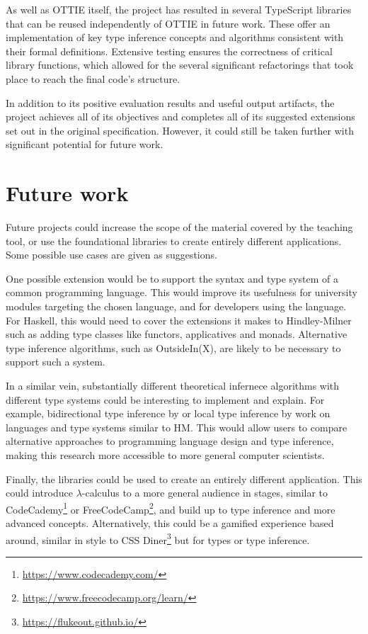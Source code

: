 \documentclass[a4paper,fleqn,oneside,12pt]{report}
\begin{document}
As well as OTTIE itself, the project has resulted in several TypeScript libraries that can be reused independently of OTTIE in future work. These offer an implementation of key type inference concepts and algorithms consistent with their formal definitions. Extensive testing ensures the correctness of critical library functions, which allowed for the several significant refactorings that took place to reach the final code's structure.

In addition to its positive evaluation results and useful output artifacts, the project achieves all of its objectives and completes all of its suggested extensions set out in the original specification. However, it could still be taken further with significant potential for future work.

\section{Future work}

Future projects could increase the scope of the material covered by the teaching tool, or use the foundational libraries to create entirely different applications. Some possible use cases are given as suggestions.

One possible extension would be to support the syntax and type system of a common programming language. This would improve its usefulness for university modules targeting the chosen language, and for developers using the language. For Haskell, this would need to cover the extensions it makes to Hindley-Milner such as adding type classes like functors, applicatives and monads. Alternative type inference algorithms, such as OutsideIn(X), are likely to be necessary to support such a system.

In a similar vein, substantially different theoretical infernece algorithms with different type systems could be interesting to implement and explain. For example, bidirectional type inference by \cite{ref38} or local type inference by \cite{ref39} work on languages and type systems similar to HM. This would allow users to compare alternative approaches to programming language design and type inference, making this research more accessible to more general computer scientists.

Finally, the libraries could be used to create an entirely different application. This could introduce $\lambda$-calculus to a more general audience in stages, similar to CodeCademy\footnote{\href{https://www.codecademy.com/}{https://www.codecademy.com/}} or FreeCodeCamp\footnote{\href{https://www.freecodecamp.org/learn/}{https://www.freecodecamp.org/learn/}}, and build up to type inference and more advanced concepts. Alternatively, this could be a gamified experience based around, similar in style to CSS Diner\footnote{\href{https://flukeout.github.io/}{https://flukeout.github.io/}} but for types or type inference.
\end{document}
